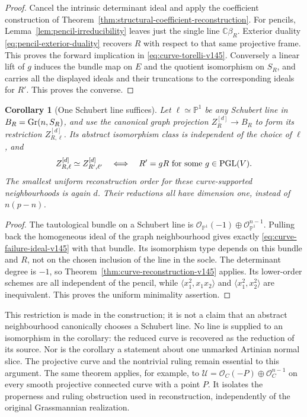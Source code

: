 \documentclass[11pt,reqno]{amsart}
\numberwithin{equation}{section}
\newtheorem{corollary}[theorem]{Corollary}
\theoremstyle{definition}\newtheorem{definition}[theorem]{Definition}
\theoremstyle{remark}\newtheorem{remark}[theorem]{Remark}
\newcommand{\C}{\mathbb C}\newcommand{\Q}{\mathbb Q}
\newcommand{\Pj}{\mathbb P}\newcommand{\A}{\mathbb A}
\newcommand{\OO}{\mathcal O}\newcommand{\II}{\mathcal I}
\begin{document}
\begin{proof}
Cancel the intrinsic determinant ideal and apply the coefficient
construction of Theorem~\ref{thm:structural-coefficient-reconstruction}.
For pencils, Lemma~\ref{lem:pencil-irreducibility} leaves just the
single line \(\C\beta_R\).  Exterior duality
\eqref{eq:pencil-exterior-duality} recovers \(R\) with respect to
that same projective frame.  This proves the forward implication in
\eqref{eq:curve-torelli-v145}.  Conversely a linear lift of \(g\)
induces the bundle map on \(E\) and the quotient isomorphism on
\(S_R\), and carries all the displayed ideals and their truncations
to the corresponding ideals for \(R'\).  This proves the converse.
\end{proof}

\begin{corollary}[One Schubert line suffices]
\label{cor:schubert-line-reconstruction-v145}
Let \(\ell\simeq\Pj^1\) be any Schubert line in
\(B_R=\operatorname{Gr}(n,S_R)\), and use the canonical graph projection
\(Z_R^{[d]}\to B_R\) to form its restriction \(Z_{R,\ell}^{[d]}\).
Its abstract isomorphism class is independent of the choice of
\(\ell\), and
\[
 Z_{R,\ell}^{[d]}\simeq Z_{R',\ell'}^{[d]}
       \quad\Longleftrightarrow\quad R'=gR
                       \text{ for some }g\in\operatorname{PGL}(V).
\]
The smallest uniform reconstruction order for these curve-supported
neighbourhoods is again \(d\).  Their reductions all have dimension
one, instead of \(n(p-n)\).
\end{corollary}
\begin{proof}
The tautological bundle on a Schubert line is
\(\OO_{\Pj^1}(-1)\oplus\OO_{\Pj^1}^{n-1}\).
Pulling back the homogeneous ideal of the graph neighbourhood gives
exactly \eqref{eq:curve-failure-ideal-v145} with that bundle.  Its
isomorphism type depends on this bundle and \(R\), not on the
chosen inclusion of the line in the socle.  The determinant degree
is \(-1\), so Theorem~\ref{thm:curve-reconstruction-v145} applies.
Its lower-order schemes are all independent of the pencil, while
\(\langle x_1^2,x_1x_2\rangle\) and
\(\langle x_1^2,x_2^2\rangle\) are inequivalent.  This proves
the uniform minimality assertion.
\end{proof}

This restriction is made in the construction; it is not a claim that
an abstract neighbourhood canonically chooses a Schubert line.  No
line is supplied to an isomorphism in the corollary: the reduced curve
is recovered as the reduction of its source.  Nor is the corollary a
statement about one unmarked Artinian normal slice.  The projective
curve and the nontrivial ruling remain essential to this argument.
The same theorem applies, for example, to
\(\mathcal U=\OO_C(-P)\oplus\OO_C^{n-1}\) on every smooth
projective connected curve with a point \(P\).  It isolates the
properness and ruling obstruction used in reconstruction, independently
of the original Grassmannian realization.
\end{document}
